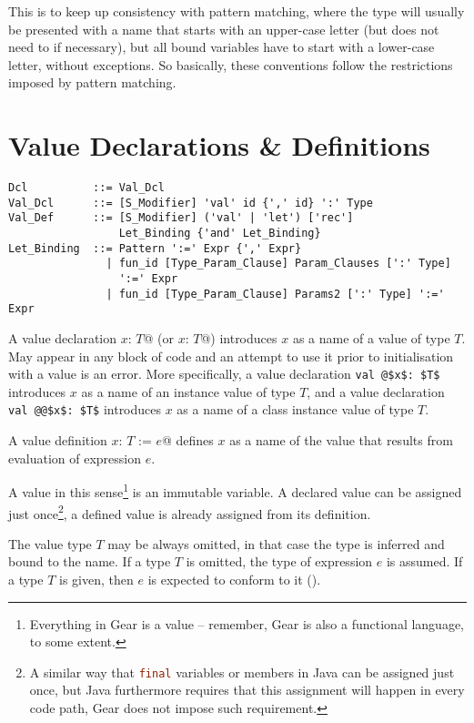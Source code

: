 This is to keep up consistency with pattern matching, where the type will usually be presented with a name that starts with an upper-case letter (but does not need to if necessary), but all bound variables have to start with a lower-case letter, without exceptions. So basically, these conventions follow the restrictions imposed by pattern matching. 





\section{Value Declarations \& Definitions}
\label{sec:value-dcl-def}

\syntax\begin{lstlisting}
Dcl          ::= Val_Dcl
Val_Dcl      ::= [S_Modifier] 'val' id {',' id} ':' Type
Val_Def      ::= [S_Modifier] ('val' | 'let') ['rec']
                 Let_Binding {'and' Let_Binding}
Let_Binding  ::= Pattern ':=' Expr {',' Expr}
               | fun_id [Type_Param_Clause] Param_Clauses [':' Type]
                 ':=' Expr
               | fun_id [Type_Param_Clause] Params2 [':' Type] ':=' Expr
\end{lstlisting}

A value declaration \lstinline@val $x$: $T$@ (or \lstinline@let $x$: $T$@) introduces $x$ as a name of a value of type $T$. May appear in any block of code and an attempt to use it prior to initialisation with a value is an error. More specifically, a value declaration \lstinline+val @$x$: $T$+ introduces $x$ as a name of an instance value of type $T$, and a value declaration \lstinline+val @@$x$: $T$+ introduces $x$ as a name of a class instance value of type $T$. 

A value definition \lstinline@val $x$: $T$ := $e$@ defines $x$ as a name of the value that results from evaluation of expression $e$.

A value in this sense\footnote{Everything in Gear is a value -- remember, Gear is also a functional language, to some extent.} is an immutable variable. A declared value can be assigned just once\footnote{A similar way that \lstinline[language=Java]@final@ variables or members in Java can be assigned just once, but Java furthermore requires that this assignment will happen in every code path, Gear does not impose such requirement.}, a defined value is already assigned from its definition. 

The value type $T$ may be always omitted, in that case the type is inferred and bound to the name. If a type $T$ is omitted, the type of expression $e$ is assumed. If a type $T$ is given, then $e$ is expected to conform to it (). 

